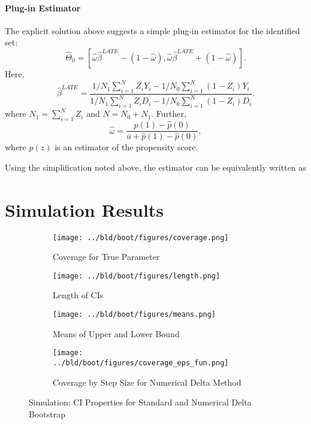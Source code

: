 \documentclass[11pt,a4paper,english]{article} %
\numberwithin{equation}{section}
\numberwithin{figure}{section}
\numberwithin{table}{section}
\theoremstyle{definition}
\theoremstyle{remark}
\begin{document}
\paragraph{Plug-in Estimator}
The explicit solution above suggests a simple plug-in estimator for the identified set:
\begin{equation}
	\hat{\Theta}_0 = \left[\hat{\omega} \hat{\beta}^{LATE} - (1-\hat{\omega}), \hat{\omega}\hat{\beta}^{LATE} + (1-\hat{\omega}) \right].
\end{equation}
Here,
\begin{equation}
	\hat{\beta}^{LATE}  = \frac{1/N_1 \sum_{i=1}^N Z_i Y_i - 1/N_0 \sum_{i=1}^N(1-Z_i)Y_i}{1/N_1\sum_{i=1}^N Z_i D_i - 1/N_0\sum_{i=1}^N (1-Z_i)D_i}.
\end{equation}
where $N_1 = \sum_{i=1}^N Z_i$ and $N = N_0 + N_1$. Further,
\begin{equation}
	\hat{\omega} = \frac{\hat{p}(1) - \hat{p}(0)}{\overline{u} + \hat{p}(1) - \hat{p}(0)},
\end{equation}
where $\hat{p}(z)$ is an estimator of the propensity score.

Using the simplification noted above, the estimator can be equivalently written as
\begin{equation}
	.
\end{equation}

\section{Simulation Results}

\begin{figure}
	\centering
	\begin{subfigure}{0.45\textwidth}
		\centering
		\texttt{[image: ../bld/boot/figures/coverage.png]}
		\caption{Coverage for True Parameter}
	\end{subfigure}
	\hfill
	\begin{subfigure}{0.45\textwidth}
		\centering
		\texttt{[image: ../bld/boot/figures/length.png]}
		\caption{Length of CIs}
	\end{subfigure}

	\begin{subfigure}{0.45\textwidth}
		\centering
		\texttt{[image: ../bld/boot/figures/means.png]}
		\caption{Means of Upper and Lower Bound}
	\end{subfigure}
	\hfill
	\begin{subfigure}{0.45\textwidth}
		\centering
		\texttt{[image: ../bld/boot/figures/coverage\_eps\_fun.png]}
		\caption{Coverage by Step Size for Numerical Delta Method}
	\end{subfigure}
	\caption{Simulation: CI Properties for Standard and Numerical Delta Bootstrap}\label{fig:simulation_ci_bootstrap}
\end{figure}



\end{document}
